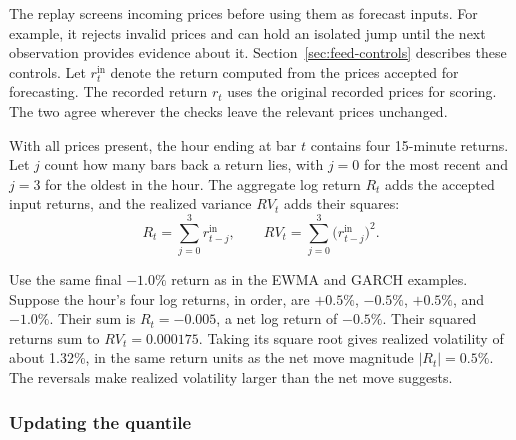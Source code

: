 \documentclass[
	12pt,				%
	openright,			%
	twoside,			%
	a4paper,
	chapter=TITLE,
	english				%
	]{abntex2}
\begin{document}
The replay screens incoming prices before using them as forecast inputs. For example, it rejects invalid prices and can hold an isolated jump until the next observation provides evidence about it. Section~\ref{sec:feed-controls} describes these controls. Let $r_t^{\mathrm{in}}$ denote the return computed from the prices accepted for forecasting. The recorded return $r_t$ uses the original recorded prices for scoring. The two agree wherever the checks leave the relevant prices unchanged.

With all prices present, the hour ending at bar $t$ contains four 15-minute returns. Let $j$ count how many bars back a return lies, with $j=0$ for the most recent and $j=3$ for the oldest in the hour. The aggregate log return $R_t$ adds the accepted input returns, and the realized variance $RV_t$ adds their squares:
\begin{equation}
  R_t=\sum_{j=0}^{3}r_{t-j}^{\mathrm{in}},\qquad
  RV_t=\sum_{j=0}^{3}\bigl(r_{t-j}^{\mathrm{in}}\bigr)^2.
  \label{eq:rv}
\end{equation}

Use the same final $-1.0\%$ return as in the EWMA and GARCH examples. Suppose the hour's four log returns, in order, are $+0.5\%$, $-0.5\%$, $+0.5\%$, and $-1.0\%$. Their sum is $R_t=-0.005$, a net log return of $-0.5\%$. Their squared returns sum to $RV_t=0.000175$. Taking its square root gives realized volatility of about 1.32\%, in the same return units as the net move magnitude $|R_t|=0.5\%$. The reversals make realized volatility larger than the net move suggests.

\subsubsection{Updating the quantile}
\end{document}
